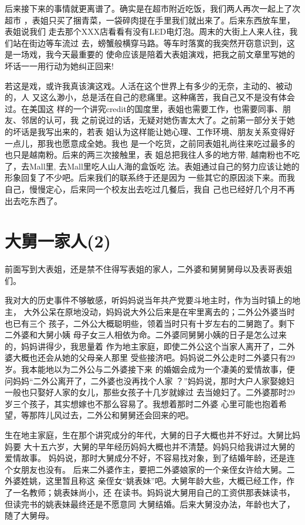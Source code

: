 \documentclass[12pt]{book}
\begin{document}
后来接下来的事情就更离谱了。确实是在超市附近吃饭，我们两人再次一起上了次超市
，表姐只买了捆青菜，一袋碎肉提在手里我们就出来了。后来东西放车里，表姐说我们
走去那个XXX店看看有没有LED电灯泡。周末的大街上人来人往，我们站在街边等车流过
去，螃蟹般横穿马路。等车时落寞的我突然开窃意识到，这是一场戏，我今天最重要的
使命应该是陪着大表姐演戏，把我之前文章里写她的坏话一一用行动为她纠正回来!

若这是戏，或许我真该演这戏。人活在这个世界上有多少的无奈，主动的、被动的，人
又这么渺小，总是活在自己的悲痛里。这种痛苦，我自己又不是没有体会过。在美国这
样的一个讲究credit的国度里，表姐也需要工作，也需要同事、朋友、邻居的认可，我
之前说过的话，无疑对她伤害太大了。之前第一部分关于她的坏话是我写出来的，若表
姐认为这样能让她心理、工作环境、朋友关系变得好一点儿，那我也愿意成全她。我也
是一个吃货，之前同表姐礼尚往来吃过最多的也只是越南粉。后来的两三次接触里，表
姐总把我往人多的地方带, 越南粉也不吃了，去Mall里, 去Mall里吃人山人海的盒饭吃
法。表姐通过自己的努力应该让她的形象回复了不少吧。后来我们的联系终于还是因为
一些其它的原因淡下来。而我自己，慢慢定心，后来同一个校友出去吃过几餐后，我自
己也已经好几个月不再出去吃东西了。
\section{大舅一家人(2)}
\label{sec-9-29}

前面写到大表姐，还是禁不住得写表姐的家人，二外婆和舅舅舅母以及表哥表姐们。

我对大的历史事件不够敏感，听妈妈说当年共产党要斗地主时，作为当时镇上的地主，
大外公呆在原地没动，妈妈说大外公后来是在牢里离去的；二外公外婆当时也已有三个
孩子，二外公大概聪明些，领着当时只有十岁左右的二舅跑了。剩下二外婆和大舅小姨
母子女三人相依为命。二外婆同舅舅小姨的日子是怎么过来的，妈妈讲得少，我思量着
作为地主家庭，即使二外公这个当家人离开了，二外婆大概也还会从她的父母亲人那里
受些接济吧。妈妈说二外公走时二外婆只有29岁。我本能地以为二外公与二外婆接下来
的婚姻会成为一个凄美的爱情故事，便问妈妈“二外公离开了，二外婆也没再找个人家
？”妈妈说，那时大户人家娶媳妇一般也只娶好人家的女儿，那些女孩子十几岁就嫁过
去当媳妇了。二外婆那时29岁三个孩子，其实想嫁也不那么容易了。我想着那时二外婆
心里可能也抱着希望，等那阵儿风过去，二外公和舅舅还会回来的吧。

生在地主家庭，生在那个讲究成分的年代，大舅的日子大概也并不好过。大舅比妈妈要
大十五六岁，大舅的早年经历妈妈大概也并不清楚。妈妈只给我讲过大舅的爱情故事。
妈妈说，那时大舅成分不好，不容易找对象，到了结婚年龄，还是连个女朋友也没有。
后来二外婆作主，要把二外婆娘家的一个亲侄女许给大舅。二外婆姓姚，这里暂且称这
亲侄女“姚表妹”吧。大舅年龄大些，大概已经工作，作了一名教师；姚表妹尚小，还
在读书。妈妈说大舅用自己的工资供那表妹读书，但读完书的姚表妹最终还是不愿意同
大舅结婚。后来大舅没办法，年龄也大了，随了大舅母。
\end{document}
